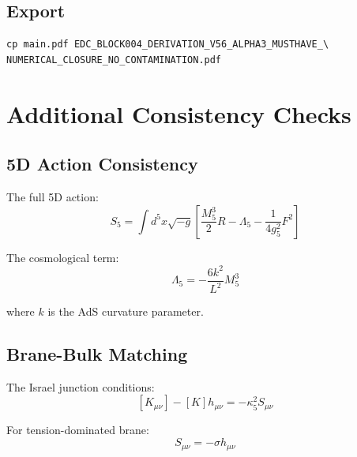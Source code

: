 \documentclass[11pt,a4paper]{article}
\theoremstyle{definition}
\begin{document}
\subsection{Export}
\label{subsec:export}

\begin{verbatim}
cp main.pdf EDC_BLOCK004_DERIVATION_V56_ALPHA3_MUSTHAVE_\
NUMERICAL_CLOSURE_NO_CONTAMINATION.pdf
\end{verbatim}

\section{Additional Consistency Checks}
\label{app:consistency}

\subsection{5D Action Consistency}
\label{subsec:5d-action-consistency}

The full 5D action:
\begin{equation}
\label{eq:full-5d-action}
S_5 = \int d^5x \sqrt{-g} \left[\frac{M_5^3}{2} R - \Lambda_5 - \frac{1}{4g_5^2}F^2\right]
\end{equation}

The cosmological term:
\begin{equation}
\label{eq:lambda-5d}
\Lambda_5 = -\frac{6k^2}{L^2} M_5^3
\end{equation}

where $k$ is the AdS curvature parameter.

\subsection{Brane-Bulk Matching}
\label{subsec:brane-bulk-matching}

The Israel junction conditions:
\begin{equation}
\label{eq:israel-junction}
[K_{\mu\nu}] - [K] h_{\mu\nu} = -\kappa_5^2 S_{\mu\nu}
\end{equation}

For tension-dominated brane:
\begin{equation}
\label{eq:tension-brane}
S_{\mu\nu} = -\sigma h_{\mu\nu}
\end{equation}
\end{document}
